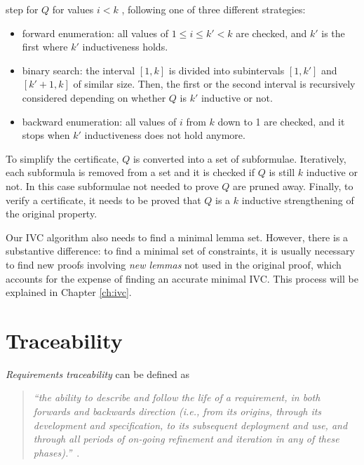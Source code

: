 step for $Q$ for values $i < k$ , following one
of three different strategies:
\begin{itemize}
  \item forward enumeration: all values of $1 \le i \leq k' < k$  are checked, and $k'$ is the first where $k'$ inductiveness holds.
  \item binary search: the interval $[1 , k ]$ is divided into
  subintervals $[1 , k' ]$ and
$[ k' + 1 , k ]$ of similar size. Then, the first or
the second interval is recursively considered depending on whether $Q$ is $k'$ inductive
or not.
  \item backward enumeration: all values of $i$ from $k$ down to 1 are checked, and it stops
when $k'$ inductiveness does not hold anymore.
\end{itemize}

To simplify the certificate, $Q$ is converted into a set of subformulae.
Iteratively, each subformula is removed from a set and it is checked if $Q$ is still $k$ inductive or not. In this case subformulae not needed to prove
$Q$ are pruned away. Finally, to verify a certificate, it needs to be proved that $Q$ is
a $k$ inductive strengthening of the original property.

Our IVC algorithm also needs to find a minimal lemma set.  However, there is a substantive difference: to find a minimal set of constraints, it is usually necessary to find new proofs involving {\em new lemmas} not used in the original proof, which accounts for the expense of finding an accurate minimal IVC. This process will be explained in Chapter \ref{ch:ivc}.


\section{Traceability}
\emph{Requirements traceability} can be defined as

\begin{quotation}
\textit{``the ability to describe and follow the life of a requirement, in both forwards and backwards direction (i.e., from its origins, through its development and specification, to its subsequent deployment and use, and through all periods of on-going refinement and iteration in any of these phases).''}~\cite{gotel}.
\end{quotation}


